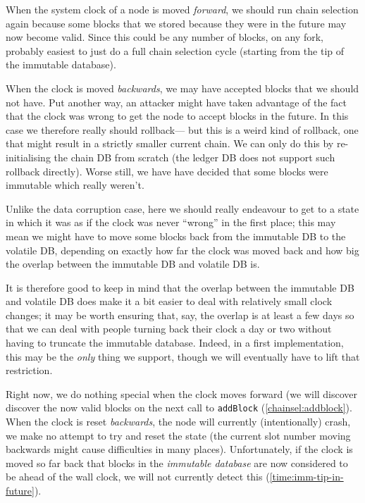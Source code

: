 When the system clock of a node is moved \emph{forward}, we should run chain
selection again because some blocks that we stored because they were in the
future may now become valid. Since this could be any number of blocks, on any
fork, probably easiest to just do a full chain selection cycle (starting from
the tip of the immutable database).

When the clock is moved \emph{backwards}, we may have accepted blocks that we
should not have. Put another way, an attacker might have taken advantage of the
fact that the clock was wrong to get the node to accept blocks in the future. In
this case we therefore really should rollback--- but this is a weird kind of
rollback, one that might result in a strictly smaller current chain. We can only
do this by re-initialising the chain DB from scratch (the ledger DB does not
support such rollback directly). Worse still, we have have decided that some
blocks were immutable which really weren't.

Unlike the data corruption case, here we should really endeavour to get to a
state in which it was as if the clock was never ``wrong'' in the first place;
this may mean we might have to move some blocks back from the immutable DB to
the volatile DB, depending on exactly how far the clock was moved back and how
big the overlap between the immutable DB and volatile DB is.

It is therefore good to keep in mind that the overlap between the immutable DB
and volatile DB does make it a bit easier to deal with relatively small clock
changes; it may be worth ensuring that, say, the overlap is at least a few days
so that we can deal with people turning back their clock a day or two without
having to truncate the immutable database. Indeed, in a first implementation,
this may be the \emph{only} thing we support, though we will eventually have to
lift that restriction.

Right now, we do nothing special when the clock moves forward (we will discover
discover the now valid blocks on the next call to \lstinline!addBlock!
(\cref{chainsel:addblock}). When the clock is reset \emph{backwards}, the node
will currently (intentionally) crash, we make no attempt to try and reset
the state (the current slot number moving backwards might cause difficulties
in many places). Unfortunately, if the clock is moved so far back that blocks
in the \emph{immutable database} are now considered to be ahead of the wall
clock, we will not currently detect this (\cref{time:imm-tip-in-future}).
